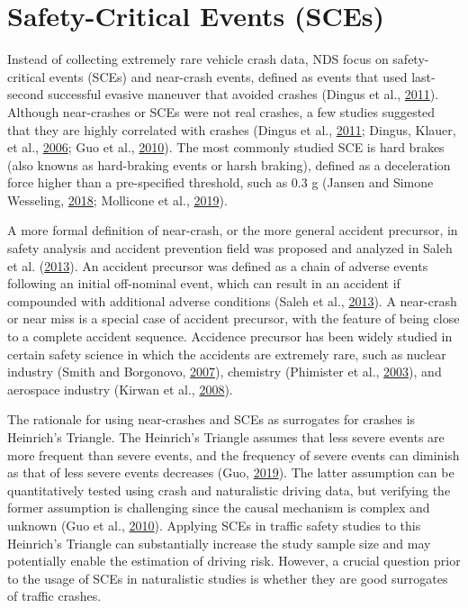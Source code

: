 \documentclass[12pt]{book}
\numberwithin{equation}{chapter}
\begin{document}
\hypertarget{safety-critical-events-sces}{%
\section{Safety-Critical Events (SCEs)}\label{safety-critical-events-sces}}

Instead of collecting extremely rare vehicle crash data, NDS focus on safety-critical events (SCEs) and near-crash events, defined as events that used last-second successful evasive maneuver that avoided crashes (Dingus et al., \protect\hyperlink{ref-dingus2011estimating}{2011}). Although near-crashes or SCEs were not real crashes, a few studies suggested that they are highly correlated with crashes (Dingus et al., \protect\hyperlink{ref-dingus2011estimating}{2011}; Dingus, Klauer, et al., \protect\hyperlink{ref-dingus2006100}{2006}; Guo et al., \protect\hyperlink{ref-guo2010near}{2010}). The most commonly studied SCE is hard brakes (also knowns as hard-braking events or harsh braking), defined as a deceleration force higher than a pre-specified threshold, such as 0.3 g (Jansen and Simone Wesseling, \protect\hyperlink{ref-jansen2018harsh}{2018}; Mollicone et al., \protect\hyperlink{ref-mollicone2019predicting}{2019}).

A more formal definition of near-crash, or the more general accident precursor, in safety analysis and accident prevention field was proposed and analyzed in Saleh et al. (\protect\hyperlink{ref-saleh2013accident}{2013}). An accident precursor was defined as a chain of adverse events following an initial off-nominal event, which can result in an accident if compounded with additional adverse conditions (Saleh et al., \protect\hyperlink{ref-saleh2013accident}{2013}). A near-crash or near miss is a special case of accident precursor, with the feature of being close to a complete accident sequence. Accidence precursor has been widely studied in certain safety science in which the accidents are extremely rare, such as nuclear industry (Smith and Borgonovo, \protect\hyperlink{ref-smith2007decision}{2007}), chemistry (Phimister et al., \protect\hyperlink{ref-phimister2003near}{2003}), and aerospace industry (Kirwan et al., \protect\hyperlink{ref-kirwan2008human}{2008}).

The rationale for using near-crashes and SCEs as surrogates for crashes is Heinrich's Triangle. The Heinrich's Triangle assumes that less severe events are more frequent than severe events, and the frequency of severe events can diminish as that of less severe events decreases (Guo, \protect\hyperlink{ref-guo2019statistical}{2019}). The latter assumption can be quantitatively tested using crash and naturalistic driving data, but verifying the former assumption is challenging since the causal mechanism is complex and unknown (Guo et al., \protect\hyperlink{ref-guo2010near}{2010}). Applying SCEs in traffic safety studies to this Heinrich's Triangle can substantially increase the study sample size and may potentially enable the estimation of driving risk. However, a crucial question prior to the usage of SCEs in naturalistic studies is whether they are good surrogates of traffic crashes.
\end{document}
